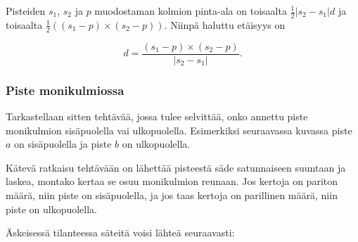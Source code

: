 Pisteiden $s_1$, $s_2$ ja $p$ muodostaman kolmion
pinta-ala on toisaalta $\frac{1}{2} |s_2-s_1| d$ ja toisaalta
$\frac{1}{2} ((s_1-p) \times (s_2-p))$.
Niinpä haluttu etäisyys on

\[ d = \frac{(s_1-p) \times (s_2-p)}{|s_2-s_1|} .\]


\subsubsection{Piste monikulmiossa}

Tarkastellaan sitten tehtävää, jossa
tulee selvittää, onko annettu piste
monikulmion sisäpuolella vai ulkopuolella.
Esimerkiksi seuraavassa kuvassa piste $a$ on
sisäpuolella ja piste $b$ on 
ulkopuolella.

\begin{center}
\end{center}

Kätevä ratkaisu tehtävään
on lähettää pisteestä säde
satunnaiseen suuntaan ja laskea,
montako kertaa se osuu monikulmion reunaan.
Jos kertoja on pariton määrä,
niin piste on sisäpuolella,
ja jos taas kertoja on parillinen määrä,
niin piste on ulkopuolella.

\begin{samepage}
Äskeisessä tilanteessa säteitä
voisi lähteä seuraavasti:
\begin{center}
\end{center}
\end{samepage}

